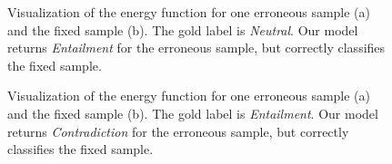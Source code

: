 \documentclass[11pt,a4paper]{article}
\begin{document}
	\begin{figure}[ht]
		\begin{center}
		\end{center}
		\caption{
			Visualization of the energy function for one erroneous sample (a) and the fixed sample (b). The gold label is \emph{Neutral}. Our model returns \emph{Entailment} for the erroneous sample, but correctly classifies the fixed sample.
		}
		\label{fig:att:miss3}
	\end{figure}
	
	\begin{figure}[ht]
		\begin{center}
		\end{center}
		\caption{
			Visualization of the energy function for one erroneous sample (a) and the fixed sample (b). The gold label is \emph{Entailment}. Our model returns \emph{Contradiction} for the erroneous sample, but correctly classifies the fixed sample.
		}
		\label{fig:att:miss4}
	\end{figure}
	
\end{document}
